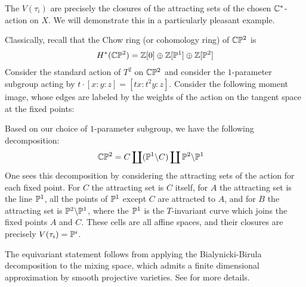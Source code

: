 The $V(\tau_i)$ are precisely the closures of the attracting sets 
of the chosen $\C^*$-action on $X$. We will demonstrate this in a particularly
pleasant example.
\begin{example}
	Classically, recall that the Chow ring (or cohomology ring) of
	 $\C\P^2$ is \begin{align*}
		H^*(\C\P^2) = \Z[0] \oplus \Z[\P^1] \oplus \Z[\P^2]
	\end{align*} Consider the standard action of $T^2$ on $\C\P^2$
	and consider the $1$-parameter subgroup acting by $t\cdot[x:y:z] = [tx:t^2y:z]$.
	Consider the following moment image, whose 
	edges are labeled by the weights of the action on the tangent space at the fixed points:
	
	\begin{center}
	\end{center}
	Based on our choice of $1$-parameter subgroup, we have the following decomposition: \begin{align*}
		\C\P^2 &= C \coprod (\P^1 \backslash C) \coprod \P^2 \backslash \P^1 
	\end{align*} One sees this decomposition by considering 
	the attracting sets of the action for each fixed point. For $C$ the 
	attracting set is $C$ itself, for $A$ the attracting set is the line $\P^1$,
	all the points of $\P^1$ except $C$ are attracted to $A$, and for $B$ the attracting
	set is $\P^2 \backslash \P^1$,
	where the $\P^1$ is the $T$-invariant curve which joins the fixed points $A$ and $C$.
	These cells are all affine spaces, and their
	 closures are precisely $V(\tau_i) = \P^i$.
\end{example}
The equivariant statement follows from applying the Bialynicki-Birula decomposition
to the mixing space, which admits a finite dimensional approximation by smooth
projective varieties. See \cite{fulton-anderson} for more details.

